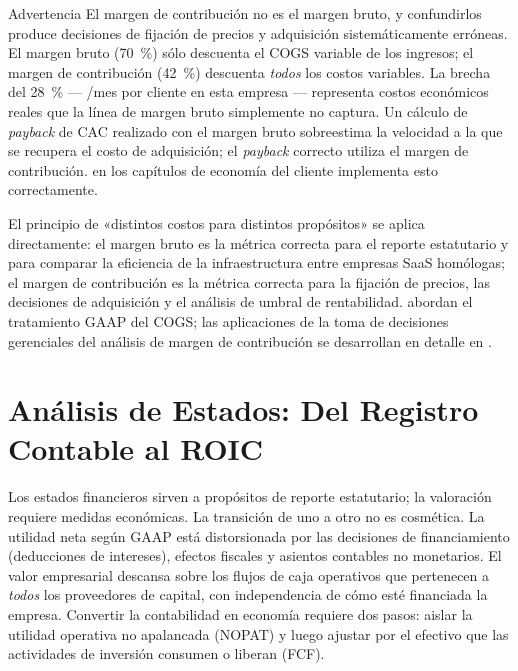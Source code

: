 \begin{admonition}{Advertencia}
El margen de contribución no es el margen bruto, y confundirlos produce decisiones de fijación de
precios y adquisición sistemáticamente erróneas. El margen bruto (\qty{70}{\percent}) sólo descuenta
el COGS variable de los ingresos; el margen de contribución (\qty{42}{\percent}) descuenta
\emph{todos} los costos variables. La brecha del \qty{28}{\percent} --- /mes por cliente
en esta empresa --- representa costos económicos reales que la línea de margen bruto simplemente no
captura. Un cálculo de \emph{payback} de CAC realizado con el margen bruto sobreestima la velocidad
a la que se recupera el costo de adquisición; el \emph{payback} correcto utiliza el margen de
contribución.  en los capítulos de economía del cliente implementa esto
correctamente.
\end{admonition}

El principio de «distintos costos para distintos propósitos» \parencite{datar2025horngrens} se
aplica directamente: el margen bruto es la métrica correcta para el reporte estatutario y para
comparar la eficiencia de la infraestructura entre empresas SaaS homólogas; el margen de
contribución es la métrica correcta para la fijación de precios, las decisiones de adquisición y
el análisis de umbral de rentabilidad. \textcite{weygandt2019financial} abordan el tratamiento GAAP
del COGS; las aplicaciones de la toma de decisiones gerenciales del análisis de margen de
contribución se desarrollan en detalle en \textcite{datar2025horngrens}.

\section{Análisis de Estados: Del Registro Contable al ROIC}\label{sec:statement-analysis}

Los estados financieros sirven a propósitos de reporte estatutario; la valoración requiere medidas
económicas. La transición de uno a otro no es cosmética. La utilidad neta según GAAP está
distorsionada por las decisiones de financiamiento (deducciones de intereses), efectos fiscales y
asientos contables no monetarios. El valor empresarial descansa sobre los flujos de caja operativos
que pertenecen a \emph{todos} los proveedores de capital, con independencia de cómo esté financiada
la empresa. Convertir la contabilidad en economía requiere dos pasos: aislar la utilidad operativa
no apalancada (NOPAT) y luego ajustar por el efectivo que las actividades de inversión consumen o
liberan (FCF).

